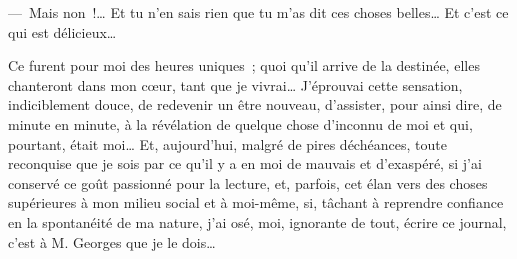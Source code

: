 {---~Mais non~!… Et tu n'en sais rien que tu m'as dit ces choses
belles… Et c'est ce qui est délicieux…

Ce furent pour moi des heures uniques~; quoi qu'il arrive de la
destinée, elles chanteront dans mon cœur, tant que je vivrai…
J'éprouvai cette sensation, indiciblement douce, de redevenir un être
nouveau, d'assister, pour ainsi dire, de minute en minute, à la
révélation de quelque chose d'inconnu de moi et qui, pourtant, était
moi… Et, aujourd'hui, malgré de pires déchéances, toute reconquise
que je sois par ce qu'il y a en moi de mauvais et d'exaspéré, si j'ai
conservé ce goût passionné pour la lecture, et, parfois, cet élan
vers des choses supérieures à mon milieu social et à moi-même, si,
tâchant à reprendre confiance en la spontanéité de ma nature, j'ai
osé, moi, ignorante de tout, écrire ce journal, c'est à M. Georges
que je le dois…
}


